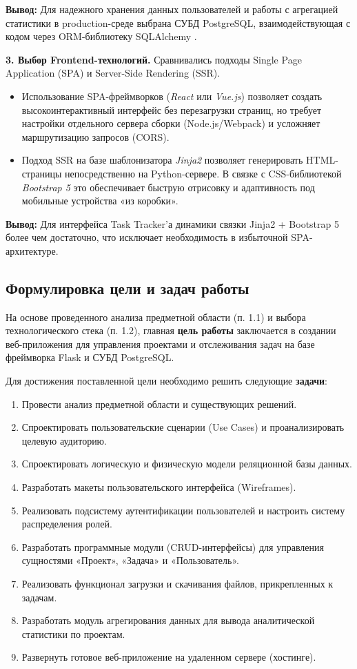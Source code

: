 \textbf{Вывод:} Для надежного хранения данных пользователей и работы с агрегацией статистики в production-среде выбрана СУБД PostgreSQL, взаимодействующая с кодом через ORM-библиотеку SQLAlchemy \cite{sqlalchemy_doc}.

\textbf{3. Выбор Frontend-технологий.} Сравнивались подходы Single Page Application (SPA) и Server-Side Rendering (SSR).
\begin{itemize}
    \item Использование SPA-фреймворков (\textit{React} или \textit{Vue.js}) позволяет создать высокоинтерактивный интерфейс без перезагрузки страниц, но требует настройки отдельного сервера сборки (Node.js/Webpack) и усложняет маршрутизацию запросов (CORS).
    \item Подход SSR на базе шаблонизатора \textit{Jinja2} позволяет генерировать HTML-страницы непосредственно на Python-сервере. В связке с CSS-библиотекой \textit{Bootstrap 5} \cite{bootstrap_doc} это обеспечивает быструю отрисовку и адаптивность под мобильные устройства «из коробки».
\end{itemize}

\textbf{Вывод:} Для интерфейса Task Tracker'а динамики связки Jinja2 + Bootstrap 5 более чем достаточно, что исключает необходимость в избыточной SPA-архитектуре.

\subsection{Формулировка цели и задач работы}

На основе проведенного анализа предметной области (п. 1.1) и выбора технологического стека (п. 1.2), главная \textbf{цель работы} заключается в создании веб-приложения для управления проектами и отслеживания задач на базе фреймворка Flask и СУБД PostgreSQL.

Для достижения поставленной цели необходимо решить следующие \textbf{задачи}:
\begin{enumerate}
    \item Провести анализ предметной области и существующих решений.
    \item Спроектировать пользовательские сценарии (Use Cases) и проанализировать целевую аудиторию.
    \item Спроектировать логическую и физическую модели реляционной базы данных.
    \item Разработать макеты пользовательского интерфейса (Wireframes).
    \item Реализовать подсистему аутентификации пользователей и настроить систему распределения ролей.
    \item Разработать программные модули (CRUD-интерфейсы) для управления сущностями «Проект», «Задача» и «Пользователь».
    \item Реализовать функционал загрузки и скачивания файлов, прикрепленных к задачам.
    \item Разработать модуль агрегирования данных для вывода аналитической статистики по проектам.
    \item Развернуть готовое веб-приложение на удаленном сервере (хостинге).
\end{enumerate}